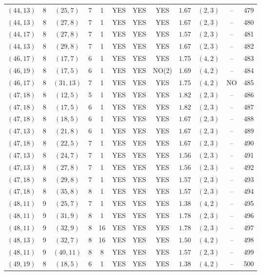 \begin{longtable}{|c|c|c|c|c|c|c|c|c|c|c|c|}
$(44,13)$ & 8 & $(25,7)$ & 7 & 1 & YES & YES & YES & $1.67$ & $(2,3)$ & -- & 479\\
$(44,13)$ & 8 & $(27,8)$ & 7 & 1 & YES & YES & YES & $1.67$ & $(2,3)$ & -- & 480\\
$(44,17)$ & 8 & $(27,8)$ & 7 & 1 & YES & YES & YES & $1.57$ & $(2,3)$ & -- & 481\\
$(44,13)$ & 8 & $(29,8)$ & 7 & 1 & YES & YES & YES & $1.67$ & $(2,3)$ & -- & 482\\
$(46,17)$ & 8 & $(17,7)$ & 6 & 1 & YES & YES & YES & $1.75$ & $(4,2)$ & -- & 483\\
$(46,19)$ & 8 & $(17,5)$ & 6 & 1 & YES & YES & NO(2) & $1.69$ & $(4,2)$ & -- & 484\\
$(46,17)$ & 8 & $(31,13)$ & 7 & 1 & YES & YES & YES & $1.75$ & $(4,2)$ & NO & 485\\
$(47,18)$ & 8 & $(12,5)$ & 5 & 1 & YES & YES & YES & $1.82$ & $(2,3)$ & -- & 486\\
$(47,18)$ & 8 & $(17,5)$ & 6 & 1 & YES & YES & YES & $1.82$ & $(2,3)$ & -- & 487\\
$(47,18)$ & 8 & $(18,5)$ & 6 & 1 & YES & YES & YES & $1.67$ & $(2,3)$ & -- & 488\\
$(47,13)$ & 8 & $(21,8)$ & 6 & 1 & YES & YES & YES & $1.67$ & $(2,3)$ & -- & 489\\
$(47,18)$ & 8 & $(22,5)$ & 7 & 1 & YES & YES & YES & $1.67$ & $(2,3)$ & -- & 490\\
$(47,13)$ & 8 & $(24,7)$ & 7 & 1 & YES & YES & YES & $1.56$ & $(2,3)$ & -- & 491\\
$(47,13)$ & 8 & $(27,8)$ & 7 & 1 & YES & YES & YES & $1.56$ & $(2,3)$ & -- & 492\\
$(47,18)$ & 8 & $(29,8)$ & 7 & 1 & YES & YES & YES & $1.57$ & $(2,3)$ & -- & 493\\
$(47,18)$ & 8 & $(35,8)$ & 8 & 1 & YES & YES & YES & $1.57$ & $(2,3)$ & -- & 494\\
$(48,11)$ & 9 & $(25,7)$ & 7 & 1 & YES & YES & YES & $1.38$ & $(4,2)$ & -- & 495\\
$(48,11)$ & 9 & $(31,9)$ & 8 & 1 & YES & YES & YES & $1.78$ & $(2,3)$ & -- & 496\\
$(48,11)$ & 9 & $(32,9)$ & 8 & 16 & YES & YES & YES & $1.78$ & $(2,3)$ & -- & 497\\
$(48,13)$ & 9 & $(32,7)$ & 8 & 16 & YES & YES & YES & $1.50$ & $(4,2)$ & -- & 498\\
$(48,11)$ & 9 & $(40,11)$ & 8 & 8 & YES & YES & YES & $1.57$ & $(2,3)$ & -- & 499\\
$(49,19)$ & 8 & $(18,5)$ & 6 & 1 & YES & YES & YES & $1.38$ & $(4,2)$ & -- & 500\\

\end{longtable}
